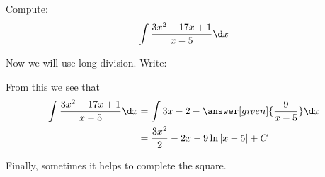 \documentclass[nooutcomes]{ximera}
\begin{document}
\begin{example}
  Compute:
  \[
  \int \frac{3x^2-17x +1}{x-5} \d x
  \]
  \begin{explanation}
    Now we will use long-division. Write:
    \begin{center}%
    \end{center}
    From this we see that
    \begin{align*}
      \int \frac{3x^2-17x +1}{x-5} \d x &= \int 3x-2 - \answer[given]{\frac{9}{x-5}}\d x\\
      &= \frac{3x^2}{2} - 2x -9 \ln|x-5| +C
    \end{align*}
  \end{explanation}
\end{example}

Finally, sometimes it helps to complete the square.
\end{document}
